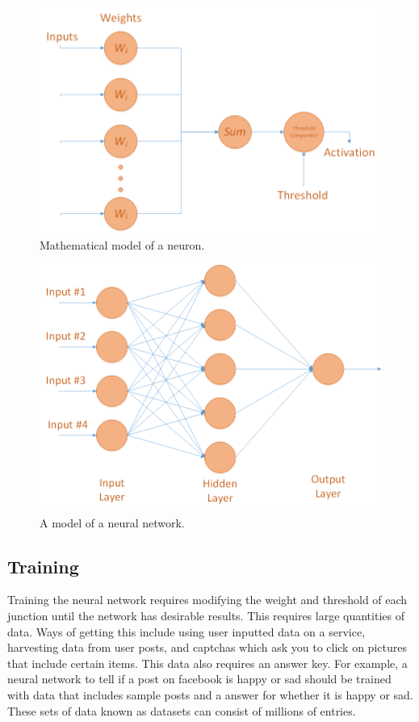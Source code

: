 \documentclass[12pt]{article}
\begin{document}
    \begin{figure}
        \begin{center}
            \includegraphics[width=5in]{Neuron.png}
        \end{center}
        \caption{Mathematical model of a neuron.}
        \label{fig:Neuron}
    \end{figure}

    \begin{figure}
        \begin{center}
            \includegraphics[width=5in]{Neural_Network.png}
        \end{center}
        \caption{A model of a neural network.}
        \label{fig:NN}
    \end{figure}
    
    \subsection{Training}
    Training the neural network requires modifying the weight and threshold of each junction until the network has desirable results. This requires large quantities of data. Ways of getting this include using user inputted data on a service, harvesting data from user posts, and captchas which ask you to click on pictures that include certain items. This data also requires an answer key. For example, a neural network to tell if a post on facebook is happy or sad should be trained with data that includes sample posts and a answer for whether it is happy or sad. These sets of data known as datasets can consist of millions of entries.
\end{document}
